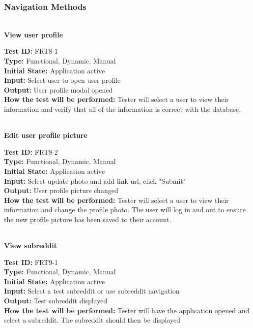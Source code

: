 \documentclass[12pt,fleqn]{article}
\begin{document}
\subsubsection{Navigation Methods}

\textbf{\\View user profile}
\begin{tcolorbox}
\textbf{Test ID:} FRT8-1\\
\textbf{Type:} Functional, Dynamic, Manual\\
\textbf{Initial State:} Application active \\
\textbf{Input:} Select user to open user profile  \\
\textbf{Output:} User profile modal opened\\
\textbf{How the test will be performed:} Tester will select a user to view their information and verify that all of the information is correct with the database.
\end{tcolorbox}

\textbf{\\Edit user profile picture}
\begin{tcolorbox}
\textbf{Test ID:} FRT8-2\\
\textbf{Type:} Functional, Dynamic, Manual\\
\textbf{Initial State:} Application active \\
\textbf{Input:} Select update photo and add link url, click "Submit"  \\
\textbf{Output:} User profile picture changed\\
\textbf{How the test will be performed:} Tester will select a user to view their information and change the profile photo.  The user will log in and out to ensure the new profile picture has been saved to their account.
\end{tcolorbox}

\textbf{\\View subreddit}
\begin{tcolorbox}
\textbf{Test ID:} FRT9-1\\ %
\textbf{Type:} Functional, Dynamic, Manual\\
\textbf{Initial State:} Application active \\
\textbf{Input:} Select a test subreddit or use subreddit navigation \\
\textbf{Output:} Test subreddit displayed\\
\textbf{How the test will be performed:} Tester will have the application opened and select a subreddit. The subreddit should then be displayed
\end{tcolorbox}
\end{document}
